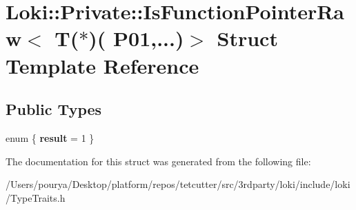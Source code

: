 \hypertarget{structLoki_1_1Private_1_1IsFunctionPointerRaw_3_01T_07_5_08_07_01_01_01_01_01_01_01_01_01_01_01_8956c6e2f9683f034f8d1a8f0074adba}{}\section{Loki\+:\+:Private\+:\+:Is\+Function\+Pointer\+Raw$<$ T($\ast$)( P01,...)$>$ Struct Template Reference}
\label{structLoki_1_1Private_1_1IsFunctionPointerRaw_3_01T_07_5_08_07_01_01_01_01_01_01_01_01_01_01_01_8956c6e2f9683f034f8d1a8f0074adba}
\subsection*{Public Types}
\begin{DoxyCompactItemize}
\item 
\hypertarget{structLoki_1_1Private_1_1IsFunctionPointerRaw_3_01T_07_5_08_07_01_01_01_01_01_01_01_01_01_01_01_8956c6e2f9683f034f8d1a8f0074adba_af058b0b8cc72a0beca6680abecd061d0}{}enum \{ {\bfseries result} = 1
 \}\label{structLoki_1_1Private_1_1IsFunctionPointerRaw_3_01T_07_5_08_07_01_01_01_01_01_01_01_01_01_01_01_8956c6e2f9683f034f8d1a8f0074adba_af058b0b8cc72a0beca6680abecd061d0}

\end{DoxyCompactItemize}


The documentation for this struct was generated from the following file\+:\begin{DoxyCompactItemize}
\item 
/\+Users/pourya/\+Desktop/platform/repos/tetcutter/src/3rdparty/loki/include/loki/Type\+Traits.\+h\end{DoxyCompactItemize}
